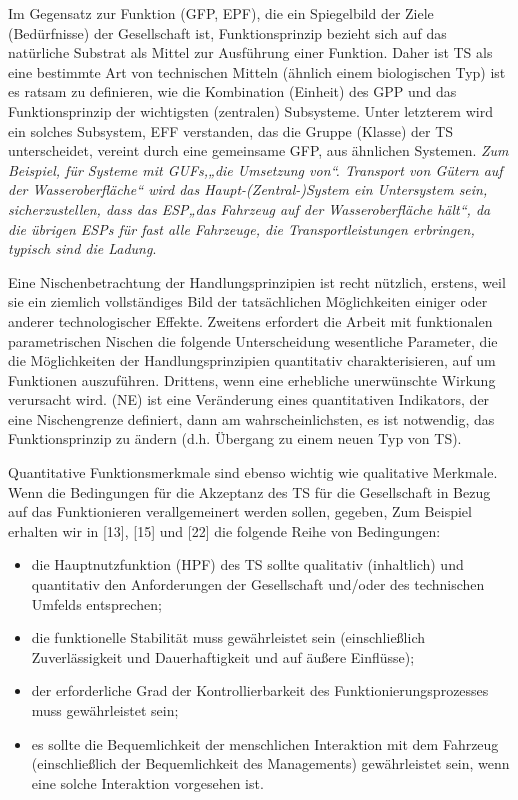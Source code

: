 \documentclass[11pt,a4paper]{article}
\begin{document}
Im Gegensatz zur Funktion (GFP, EPF), die ein Spiegelbild der Ziele
(Bedürfnisse) der Gesellschaft ist, Funktionsprinzip bezieht sich auf das
natürliche Substrat als Mittel zur Ausführung einer Funktion.  Daher ist TS
als eine bestimmte Art von technischen Mitteln (ähnlich einem biologischen
Typ) ist es ratsam zu definieren, wie die Kombination (Einheit) des GPP und
das Funktionsprinzip der wichtigsten (zentralen) Subsysteme. Unter letzterem
wird ein solches Subsystem, EFF verstanden, das die Gruppe (Klasse) der TS
unterscheidet, vereint durch eine gemeinsame GFP, aus ähnlichen Systemen.
\emph{Zum Beispiel, für Systeme mit GUFs,„die Umsetzung von“.  Transport von
  Gütern auf der Wasseroberfläche“ wird das Haupt-(Zentral-)System ein
  Untersystem sein, sicherzustellen, dass das ESP„das Fahrzeug auf der
  Wasseroberfläche hält“, da die übrigen ESPs für fast alle Fahrzeuge, die
  Transportleistungen erbringen, typisch sind die Ladung}.

Eine Nischenbetrachtung der Handlungsprinzipien ist recht nützlich, erstens,
weil sie ein ziemlich vollständiges Bild der tatsächlichen Möglichkeiten
einiger oder anderer technologischer Effekte.  Zweitens erfordert die Arbeit
mit funktionalen parametrischen Nischen die folgende Unterscheidung
wesentliche Parameter, die die Möglichkeiten der Handlungsprinzipien
quantitativ charakterisieren, auf um Funktionen auszuführen. Drittens, wenn
eine erhebliche unerwünschte Wirkung verursacht wird.  (NE) ist eine
Veränderung eines quantitativen Indikators, der eine Nischengrenze definiert,
dann am wahrscheinlichsten, es ist notwendig, das Funktionsprinzip zu ändern
(d.h. Übergang zu einem neuen Typ von TS).

Quantitative Funktionsmerkmale sind ebenso wichtig wie qualitative Merkmale.
Wenn die Bedingungen für die Akzeptanz des TS für die Gesellschaft in Bezug
auf das Funktionieren verallgemeinert werden sollen, gegeben, Zum Beispiel
erhalten wir in [13], [15] und [22] die folgende Reihe von Bedingungen:
\begin{itemize}
\item die Hauptnutzfunktion (HPF) des TS sollte qualitativ (inhaltlich) und
  quantitativ den Anforderungen der Gesellschaft und/oder des technischen
  Umfelds entsprechen;
\item die funktionelle Stabilität muss gewährleistet sein (einschließlich
  Zuverlässigkeit und Dauerhaftigkeit und auf äußere Einflüsse);
\item der erforderliche Grad der Kontrollierbarkeit des
  Funktionierungsprozesses muss gewährleistet sein;
\item es sollte die Bequemlichkeit der menschlichen Interaktion mit dem
  Fahrzeug (einschließlich der Bequemlichkeit des Managements) gewährleistet
  sein, wenn eine solche Interaktion vorgesehen ist.
\end{itemize}
\end{document}
